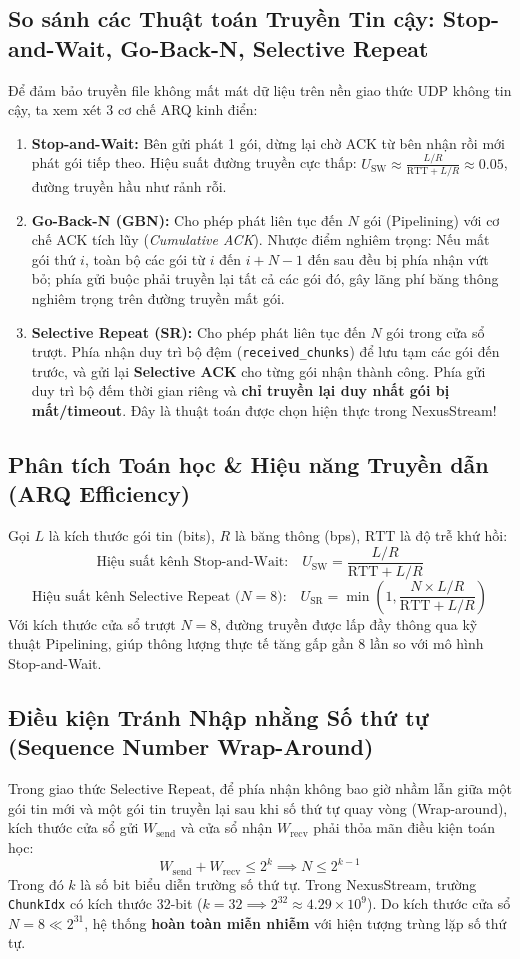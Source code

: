 \documentclass[11pt,a4paper]{article}
\begin{document}
\subsection{So sánh các Thuật toán Truyền Tin cậy: Stop-and-Wait, Go-Back-N, Selective Repeat}
Để đảm bảo truyền file không mất mát dữ liệu trên nền giao thức UDP không tin cậy, ta xem xét 3 cơ chế ARQ kinh điển:
\begin{enumerate}
    \item \textbf{Stop-and-Wait:} Bên gửi phát 1 gói, dừng lại chờ ACK từ bên nhận rồi mới phát gói tiếp theo. Hiệu suất đường truyền cực thấp: $U_{\text{SW}} \approx \frac{L/R}{\text{RTT} + L/R} \approx 0.05$, đường truyền hầu như rảnh rỗi.
    \item \textbf{Go-Back-N (GBN):} Cho phép phát liên tục đến $N$ gói (Pipelining) với cơ chế ACK tích lũy (\textit{Cumulative ACK}). Nhược điểm nghiêm trọng: Nếu mất gói thứ $i$, toàn bộ các gói từ $i$ đến $i+N-1$ đến sau đều bị phía nhận vứt bỏ; phía gửi buộc phải truyền lại tất cả các gói đó, gây lãng phí băng thông nghiêm trọng trên đường truyền mất gói.
    \item \textbf{Selective Repeat (SR):} Cho phép phát liên tục đến $N$ gói trong cửa sổ trượt. Phía nhận duy trì bộ đệm (\texttt{received\_chunks}) để lưu tạm các gói đến trước, và gửi lại \textbf{Selective ACK} cho từng gói nhận thành công. Phía gửi duy trì bộ đếm thời gian riêng và \textbf{chỉ truyền lại duy nhất gói bị mất/timeout}. Đây là thuật toán được chọn hiện thực trong NexusStream!
\end{enumerate}

\subsection{Phân tích Toán học & Hiệu năng Truyền dẫn (ARQ Efficiency)}
Gọi $L$ là kích thước gói tin (bits), $R$ là băng thông (bps), $\text{RTT}$ là độ trễ khứ hồi:
$$\text{Hiệu suất kênh Stop-and-Wait:}\quad U_{\text{SW}} = \frac{L/R}{\text{RTT} + L/R}$$
$$\text{Hiệu suất kênh Selective Repeat ($N=8$):}\quad U_{\text{SR}} = \min\left(1, \frac{N \times L/R}{\text{RTT} + L/R}\right)$$
Với kích thước cửa sổ trượt $N=8$, đường truyền được lấp đầy thông qua kỹ thuật Pipelining, giúp thông lượng thực tế tăng gấp gần 8 lần so với mô hình Stop-and-Wait.

\subsection{Điều kiện Tránh Nhập nhằng Số thứ tự (Sequence Number Wrap-Around)}
Trong giao thức Selective Repeat, để phía nhận không bao giờ nhầm lẫn giữa một gói tin mới và một gói tin truyền lại sau khi số thứ tự quay vòng (Wrap-around), kích thước cửa sổ gửi $W_{\text{send}}$ và cửa sổ nhận $W_{\text{recv}}$ phải thỏa mãn điều kiện toán học:
$$W_{\text{send}} + W_{\text{recv}} \le 2^k \implies N \le 2^{k-1}$$
Trong đó $k$ là số bit biểu diễn trường số thứ tự. Trong NexusStream, trường \texttt{ChunkIdx} có kích thước 32-bit ($k=32 \implies 2^{32} \approx 4.29 \times 10^9$). Do kích thước cửa sổ $N=8 \ll 2^{31}$, hệ thống \textbf{hoàn toàn miễn nhiễm} với hiện tượng trùng lặp số thứ tự.
\end{document}
